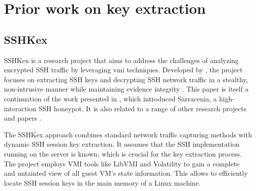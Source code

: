 \section{Prior work on key extraction}\label{sec:background:kex}

    \subsection{SSHKex}\label{sec:background:kex:sshkex}
    
    SSHKex is a research project that aims to address the challenges of analyzing encrypted SSH traffic by leveraging \acrfull{vmi} techniques. Developed by \citeauthor{SSHkex22}, the project focuses on extracting SSH keys and decrypting SSH network traffic in a stealthy, non-intrusive manner while maintaining evidence integrity \cite{SSHkex22}. This paper is itself a continuation of the work presented in  \cite{SarraceniaSSHHoneypot18}, which introduced Sarracenia, a high-interaction SSH honeypot. It is also related to a range of other research projects and papers \cite[section 5.6 and 6]{SSHkex22}.
    
    The SSHKex approach combines standard network traffic capturing methods with dynamic SSH session key extraction. It assumes that the SSH implementation running on the server is known, which is crucial for the key extraction process. The project employs VMI tools like LibVMI and Volatility to gain a complete and untainted view of all guest VM's state information. This allows to efficiently locate SSH session keys in the main memory of a Linux machine. 

